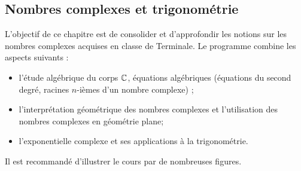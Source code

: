 \subsection{Nombres complexes et trigonométrie}
L’objectif de ce chapitre est de consolider et d’approfondir les notions sur les nombres complexes acquises en classe de 
Terminale. Le programme combine les aspects suivants :
\begin{itemize}
 \item l’étude algébrique du corps $\mathbb{C}$, équations algébriques (équations du second degré, racines $n$-ièmes d'un nombre complexe) ;  
 \item l’interprétation géométrique des nombres complexes et l’utilisation des nombres complexes en géométrie plane;
 \item l’exponentielle complexe et ses applications à la trigonométrie.
\end{itemize}
Il est recommandé d’illustrer le cours par de nombreuses figures.

\begin{parcolumns}[rulebetween,distance=\parcoldist]{2}
  \colplacechunks

  \colchunk{}
  \colplacechunks

  \colchunk{}
  \colplacechunks

  \colplacechunks
\end{parcolumns}

\begin{parcolumns}[rulebetween,distance=\parcoldist]{2}
  \colplacechunks

  \colchunk{}
  \colplacechunks

  \colchunk{}
  \colplacechunks
\end{parcolumns}


